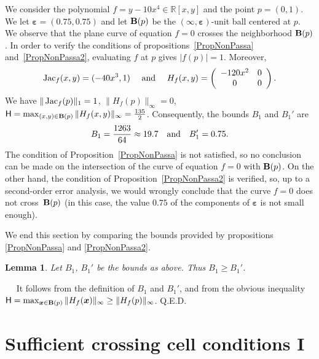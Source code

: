 \documentclass[10pt]{article}
\newcommand\qed{{\hspace*{\fill}Q.E.D.\vskip12pt plus 1pt}}
\newcommand{\x}{{\bm x}}
\newcommand\proof{\noindent{\em Proof.}\ \ } \newcommand\mult{\mbox{\rm mult}}
\newcommand{\epsbold}{{\bm \varepsilon}}
\def\Jac{\mathop{\rm Jac}\nolimits}
\newtheorem{lemma}[theorem]{Lemma}
\newtheorem{examp}[theorem]{Example}
\newenvironment{example*}{\begin{examp}\em}{\end{examp}}
\begin{document}
\begin{example*}
We consider the polynomial $f=y -10x^4 \in \mathbb R[x,y]$ 
and the point $p=(0,1)$. We let $\epsbold =(0.75,0.75)$ and 
 let $ {\bf B}(p)$
be  the $(\infty,\epsbold)$-unit ball  centered at $p$.
We observe that the plane curve of equation  $f=0$ crosses the 
neighborhood ${\bf B}(p)$. In order to verify the conditions
of propositions~\ref{PropNonPassa} and~\ref{PropNonPassa2}, evaluating    $f$ at $p$ gives $|f(p)| = 1$. Moreover,
\begin{eqnarray*}
\Jac_f(x,y)= (-40x^3, 1 ) 
\quad \textrm{ and } \quad 
H_f(x,y)=\left ( \begin{array}{cl}
-120x^2 & 0\\
0 & 0
\end{array}\right). 
\end{eqnarray*}
We have $\|\Jac_f(p)\|_1 =1$, $\|H_f(p)\|_\infty =0$,
${\mathsf H} = \max_{(x,y) \in {\bf  B}(p)}\|H_f(x,y)\|_\infty =\frac{135}{2}$. 
Consequently, the bounds $B_1$ and $B_1'$ are
$$
B_1 =\frac{1263}{64}\approx 19.7 \quad {\rm and } \quad B_1' = 0.75.
$$
The condition of Proposition~\ref{PropNonPassa} is not satisfied, 
so no conclusion can be made on the intersection of the curve of equation $f=0$
with ${\bf B} (p)$. On the other hand, the condition 
of Proposition~\ref{PropNonPassa2} is verified, so, up to a second-order 
error analysis, we would  wrongly conclude that the curve $f=0$ does not cross~${\bf  B}(p)$ (in this case, the value $0.75$ of the components of $\epsbold $ is not small enough).
\end{example*}

We end this section  by comparing  the bounds  provided by propositions \ref{PropNonPassa} and \ref{PropNonPassa2}.

\begin{lemma}\label{PropB1B1'} Let $B_1$, $B_1'$ be the bounds as above. Thus
$B_1 \ge B_1'$.
\end{lemma}
\proof
It follows from the definition of $B_1$ and $B_1'$,
and from the obvious inequality ${\mathsf H}  = \max_{\x \in {\bf  B}(p)} \|H_f(\x)\|_\infty
\ge \|H_f(p)\|_\infty$.
\qed




\section{Sufficient crossing cell conditions I}\label{passaggioCella2}
\addtocounter{subsection}{1}\setcounter{theorem}{0}
\end{document}
